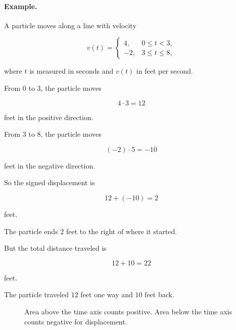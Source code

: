 \paragraph{Example.}
A particle moves along a line with velocity

\[
v(t)=
\begin{cases}
4, & 0\le t<3,\\
-2, & 3\le t\le 8,
\end{cases}
\]

where \(t\) is measured in seconds and \(v(t)\) in feet per second.

From \(0\) to \(3\), the particle moves

\[
4\cdot3=12
\]

feet in the positive direction.

From \(3\) to \(8\), the particle moves

\[
(-2)\cdot5=-10
\]

feet in the negative direction.

So the signed displacement is

\[
12+(-10)=2
\]

feet.

The particle ends \(2\) feet to the right of where it started.

But the total distance traveled is

\[
12+10=22
\]

feet.

The particle traveled \(12\) feet one way and \(10\) feet back.

\begin{figure}[h]
\centering
{}
\caption{Area above the time axis counts positive.  Area below the time axis counts negative for displacement.}
\label{fig:signed-velocity-area}
\end{figure}

